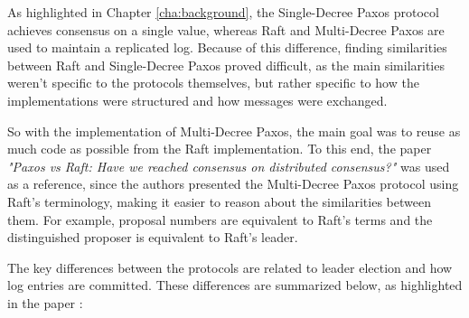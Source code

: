 \vspace{0.2cm}

As highlighted in Chapter \ref{cha:background}, the Single-Decree Paxos protocol achieves consensus on a single value, whereas Raft and Multi-Decree Paxos are used to maintain a replicated log. Because of this difference, finding similarities between Raft and Single-Decree Paxos proved difficult, as the main similarities weren't specific to the protocols themselves, but rather specific to how the implementations were structured and how messages were exchanged.

So with the implementation of Multi-Decree Paxos, the main goal was to reuse as much code as possible from the Raft implementation. To this end, the paper \textit{"Paxos vs Raft: Have we reached consensus on distributed consensus?"} \cite{paxos_vs_raft} was used as a reference, since the authors presented the Multi-Decree Paxos protocol using Raft's terminology, making it easier to reason about the similarities between them. For example, proposal numbers are equivalent to Raft's terms and the distinguished proposer is equivalent to Raft's leader.

The key differences between the protocols are related to leader election and how log entries are committed. These differences are summarized below, as highlighted in the paper \cite{paxos_vs_raft}:

